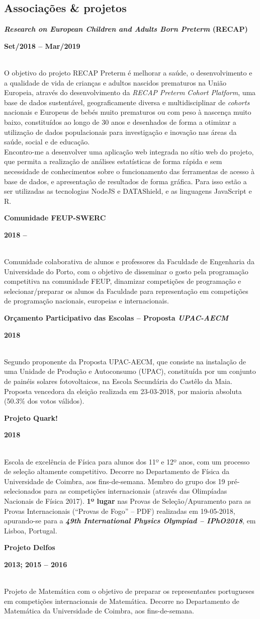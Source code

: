 \documentclass[8pt]{extarticle}
\newcommand{\parag}[1]{
\begin{minipage}{\textwidth} \hfill
\begin{minipage}{\dimexpr\textwidth-0.6cm}
	#1
\end{minipage}
\end{minipage}
}
\newcommand{\itemtime}[2]{
#1 \hfill \begin{minipage}[t]{0.185\textwidth}         #2  \end{minipage}
}
\newcommand{\job}[3]{\parag{
\itemtime{\textbf{#1}}{\textbf{#2}}\\
#3 \vspace*{9px}}}
\begin{document}
\subsection*{Associações \& projetos}
\job{\textit{Research on European Children and Adults Born Preterm} (RECAP)}{Set/2018 – Mar/2019}{
O objetivo do projeto RECAP Preterm é melhorar a saúde, o desenvolvimento e a qualidade de vida de crianças e adultos nascidos prematuros na União Europeia, através do desenvolvimento da \textit{RECAP Preterm Cohort Platform}, uma base de dados sustentável, geograficamente diversa e multidisciplinar de \textit{cohorts} nacionais e Europeus de bebés muito prematuros ou com peso à nascença muito baixo, constituídos ao longo de 30 anos e desenhados de forma a otimizar a utilização de dados populacionais para investigação e inovação nas áreas da saúde, social e de educação.\\
Encontro-me a desenvolver uma aplicação web integrada no sítio web do projeto, que permita a realização de análises estatísticas de forma rápida e sem necessidade de conhecimentos sobre o funcionamento das ferramentas de acesso à base de dados, e apresentação de resultados de forma gráfica. Para isso estão a ser utilizadas as tecnologias NodeJS e DATAShield, e as linguagens JavaScript e R.
}
\job{Comunidade FEUP-SWERC}{2018 – }{
Comunidade colaborativa de alunos e professores da Faculdade de Engenharia da Universidade do Porto, com o objetivo de disseminar o gosto pela programação competitiva na comunidade FEUP, dinamizar competições de programação e selecionar/preparar os alunos da Faculdade para representação em competições de programação nacionais, europeias e internacionais.
}
\job{Orçamento Participativo das Escolas – Proposta \textit{UPAC-AECM}}{2018}{
Segundo proponente da Proposta UPAC-AECM, que consiste na instalação de uma Unidade de Produção e Autoconsumo (UPAC), constituída por um conjunto de painéis solares fotovoltaicos, na Escola Secundária do Castêlo da Maia. Proposta vencedora da eleição realizada em 23-03-2018, por maioria absoluta (50.3\% dos votos válidos).
}
\job{Projeto Quark!}{2018}{
Escola de excelência de Física para alunos dos 11º e 12º anos, com um processo de seleção altamente competitivo. Decorre no Departamento de Física da Universidade de Coimbra, aos fins-de-semana. Membro do grupo dos 19 pré-selecionados para as competições internacionais (através das Olimpíadas Nacionais de Física 2017). \textbf{1º lugar} nas Provas de Seleção/Apuramento para as Provas Internacionais (“Provas de Fogo” – PDF) realizadas em 19-05-2018, apurando-se para a \textbf{\textit{49th International Physics Olympiad – IPhO2018}}, em Lisboa, Portugal.
}
\job{Projeto Delfos}{2013; 2015 – 2016}{
Projeto de Matemática com o objetivo de preparar os representantes portugueses em competições internacionais de Matemática. Decorre no Departamento de Matemática da Universidade de Coimbra, aos fins-de-semana.
}
\end{document}
